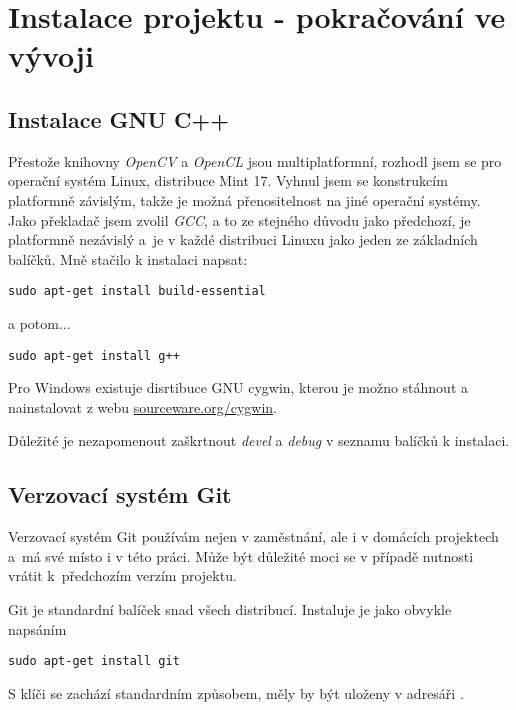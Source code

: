 \chapter{Instalace projektu - pokračování ve vývoji}
\label{kap:instalace}

\section{Instalace GNU C++}

Přestože knihovny \emph{OpenCV} a \emph{OpenCL} jsou multiplatformní, rozhodl jsem se pro operační systém Linux, distribuce Mint 17. Vyhnul jsem se konstrukcím platformně závislým, takže je možná přenositelnost na jiné operační systémy. Jako překladač jsem zvolil \emph{GCC}, a to ze stejného důvodu jako předchozí, je platformně nezávislý a~je v každé distribuci Linuxu jako jeden ze základních balíčků. Mně stačilo
k instalaci napsat:

\begin{verbatim}
sudo apt-get install build-essential
\end{verbatim}

a potom...

\begin{Verbatim}
sudo apt-get install g++
\end{Verbatim}


Pro Windows existuje disrtibuce GNU cygwin, kterou je možno stáhnout a nainstalovat z webu \url{sourceware.org/cygwin}.


Důležité je nezapomenout zaškrtnout \emph{devel} a \emph{debug} v seznamu balíčků k instalaci.



\section{Verzovací systém Git}

Verzovací systém Git používám nejen v zaměstnání, ale i v domácích
projektech a~má své místo i v této práci. Může být důležité moci se v případě
nutnosti vrátit k~předchozím verzím projektu.

Git je standardní balíček snad všech distribucí. Instaluje je jako obvykle napsáním

\begin{Verbatim} 
sudo apt-get install git
\end{Verbatim}

S klíči se zachází standardním způsobem, měly by být uloženy v
adresáři .

